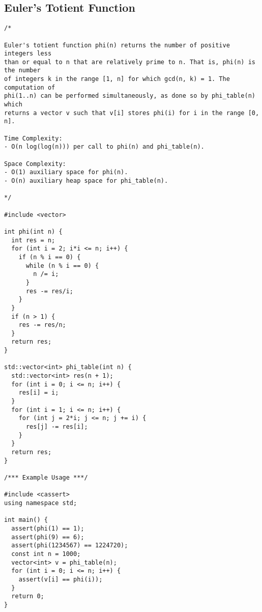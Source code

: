 \subsection{Euler's Totient Function}
\begin{lstlisting}
/*

Euler's totient function phi(n) returns the number of positive integers less
than or equal to n that are relatively prime to n. That is, phi(n) is the number
of integers k in the range [1, n] for which gcd(n, k) = 1. The computation of
phi(1..n) can be performed simultaneously, as done so by phi_table(n) which
returns a vector v such that v[i] stores phi(i) for i in the range [0, n].

Time Complexity:
- O(n log(log(n))) per call to phi(n) and phi_table(n).

Space Complexity:
- O(1) auxiliary space for phi(n).
- O(n) auxiliary heap space for phi_table(n).

*/

#include <vector>

int phi(int n) {
  int res = n;
  for (int i = 2; i*i <= n; i++) {
    if (n % i == 0) {
      while (n % i == 0) {
        n /= i;
      }
      res -= res/i;
    }
  }
  if (n > 1) {
    res -= res/n;
  }
  return res;
}

std::vector<int> phi_table(int n) {
  std::vector<int> res(n + 1);
  for (int i = 0; i <= n; i++) {
    res[i] = i;
  }
  for (int i = 1; i <= n; i++) {
    for (int j = 2*i; j <= n; j += i) {
      res[j] -= res[i];
    }
  }
  return res;
}

/*** Example Usage ***/

#include <cassert>
using namespace std;

int main() {
  assert(phi(1) == 1);
  assert(phi(9) == 6);
  assert(phi(1234567) == 1224720);
  const int n = 1000;
  vector<int> v = phi_table(n);
  for (int i = 0; i <= n; i++) {
    assert(v[i] == phi(i));
  }
  return 0;
}
\end{lstlisting}
